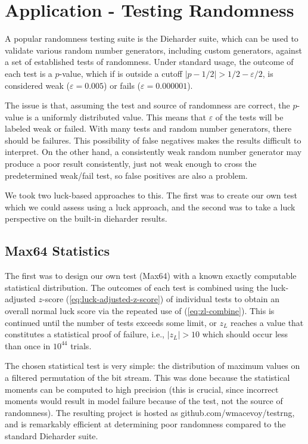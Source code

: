 \chapter{Application - Testing Randomness}
A popular randomness testing suite is the Dieharder suite, which can be used to validate various random number generators, including custom generators, against a set of established tests of randomness.  Under standard usage, the outcome of each test is a $p$-value, which if is outside a cutoff $|p-1/2|>1/2-\varepsilon/2$, is considered weak ($\varepsilon=0.005$) or fails ($\varepsilon=0.000001$).

The issue is that, assuming the test and source of randomness are correct, the $p$-value is a uniformly distributed value.  This means that $\varepsilon$ of the tests will be labeled weak or failed.  With many tests and random number generators, there should be failures.  This possibility of false negatives makes the results difficult to interpret.  On the other hand, a consistently weak random number generator may produce a poor result consistently, just not weak enough to cross the predetermined weak/fail test, so false positives are also a problem.

We took two luck-based approaches to this.  The first was to create our own test which we could assess using a luck approach, and the second was to take a luck perspective on the built-in dieharder results.

\section{Max64 Statistics}
The first was to design our own test (Max64) with a known exactly computable statistical distribution.  The outcomes of each test is combined using the luck-adjusted $z$-score (\ref{eq:luck-adjusted-z-score}) of individual tests to obtain an overall normal luck score via the repeated use of (\ref{eq:zl-combine}).  This is continued until the number of tests exceeds some limit, or $z_L$ reaches a value that constitutes a statistical proof of failure, i.e., $|z_L|>10$ which should occur less than once in $10^{44}$ trials.

The chosen statistical test is very simple: the distribution of maximum values on a filtered permutation of the bit stream.  This was done because the statistical moments can be computed to high precision (this is crucial, since incorrect moments would result in model failure because of the test, not the source of randomness).  The resulting project is hosted as github.com/wmacevoy/testrng, and is remarkably efficient at determining poor randomness compared to the standard Dieharder suite.

